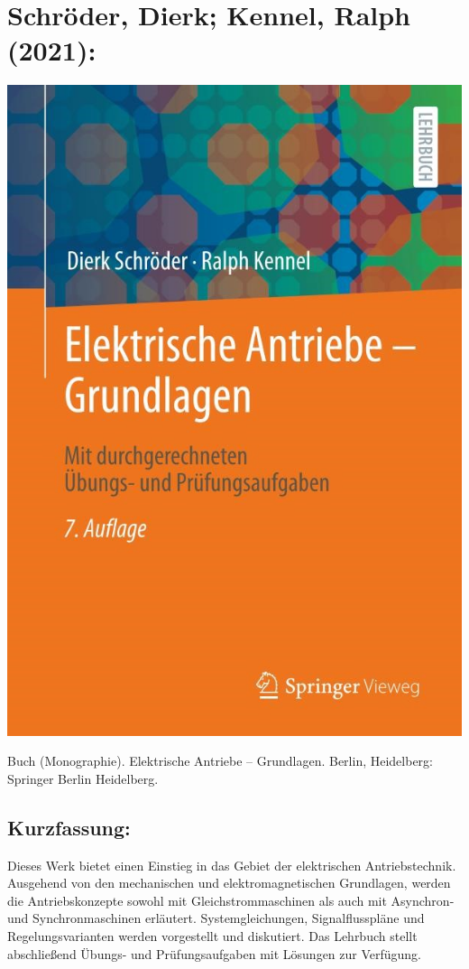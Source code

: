 \section*{Schröder, Dierk; Kennel, Ralph (2021):}
\begin{minipage}{0.5\textwidth}
	\includegraphics[width=\linewidth]{../Appendix/Literaturverzeichnis/img/Schroeder.jpg}
\end{minipage}
\hfill
\begin{minipage}{0.48\textwidth}
Buch (Monographie). Elektrische Antriebe – Grundlagen. Berlin, Heidelberg: Springer Berlin Heidelberg.	
\subsection*{Kurzfassung:}
Dieses Werk bietet einen Einstieg in das Gebiet der elektrischen Antriebstechnik. Ausgehend von den mechanischen und elektromagnetischen Grundlagen, werden die Antriebskonzepte sowohl mit Gleichstrommaschinen als auch mit Asynchron- und Synchronmaschinen erläutert. Systemgleichungen, Signalflusspläne und Regelungsvarianten werden vorgestellt und diskutiert. Das Lehrbuch stellt abschließend Übungs- und Prüfungsaufgaben mit Lösungen zur Verfügung.
\end{minipage}
